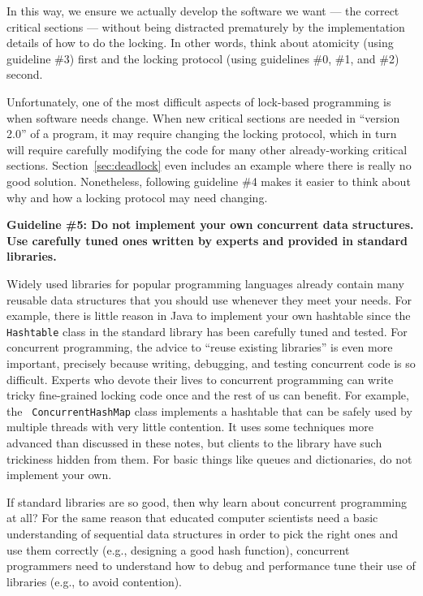 \documentclass[10pt]{article}
\begin{document}
In this way, we ensure we actually develop the software we want ---
the correct critical sections --- without being distracted prematurely
by the implementation details of how to do the locking.  In other
words, think about atomicity (using guideline \#3) first and the
locking protocol (using guidelines \#0, \#1, and \#2) second.

Unfortunately, one of the most difficult aspects of lock-based
programming is when software needs change.  When new critical sections
are needed in ``version 2.0'' of a program, it may require changing
the locking protocol, which in turn will require carefully modifying
the code for many other already-working critical sections.
Section~\ref{sec:deadlock} even includes an example where there is
really no good solution.  Nonetheless, following guideline \#4 makes
it easier to think about why and how a locking protocol may need
changing.

\goodbreak
\medskip
\noindent\textbf{Guideline \#5: Do not implement your own concurrent
  data structures.  Use carefully tuned ones written by experts and
  provided in standard libraries.}
\medskip

Widely used libraries for popular programming languages already
contain many reusable data structures that you should use whenever
they meet your needs.  For example, there is little reason in Java to
implement your own hashtable since the {\tt Hashtable} class in the
standard library has been carefully tuned and tested.  For concurrent
programming, the advice to ``reuse existing libraries'' is even more
important, precisely because writing, debugging, and testing
concurrent code is so difficult.  Experts who devote their lives to
concurrent programming can write tricky fine-grained locking code once
and the rest of us can benefit.  For example, the {\tt
  ConcurrentHashMap} class implements a hashtable that can be safely
used by multiple threads with very little contention.  It
uses some techniques more advanced than discussed in these notes, but
clients to the library have such trickiness hidden from them.  For
basic things like queues and dictionaries, do not implement your own.

If standard libraries are so good, then why learn about concurrent
programming at all?  For the same reason that educated computer
scientists need a basic understanding of sequential data structures in
order to pick the right ones and use them correctly (e.g., designing a
good hash function), concurrent programmers need to understand how to
debug and performance tune their use of libraries (e.g., to avoid
contention).
\end{document}

